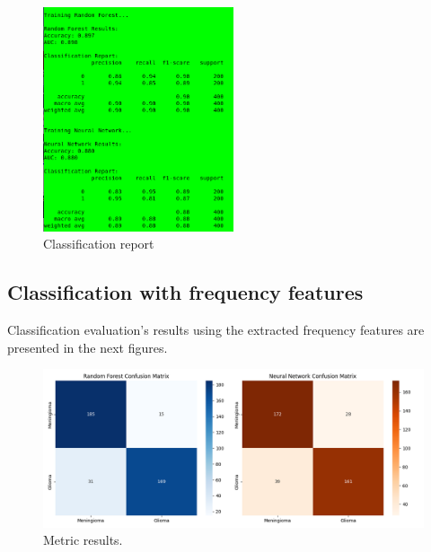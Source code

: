 \documentclass[11pt,a4paper]{article}
\begin{document}
		\begin{figure}[H]
			\centering
			\includegraphics[width=0.5\textwidth]{images/report_pyradiomics.png}
			\caption{Classification report}
			\label{fig1:}
		\end{figure}		

	\subsection{Classification with frequency features}
		

		Classification evaluation's results using the extracted frequency features are presented in the 
		next figures.

		\begin{figure}[h]
			\centering
			\includegraphics[width=1.1\textwidth]{images/freq_metrics.png}
			\caption{Metric results.}
			\label{fig1:}
		\end{figure}		
\end{document}
